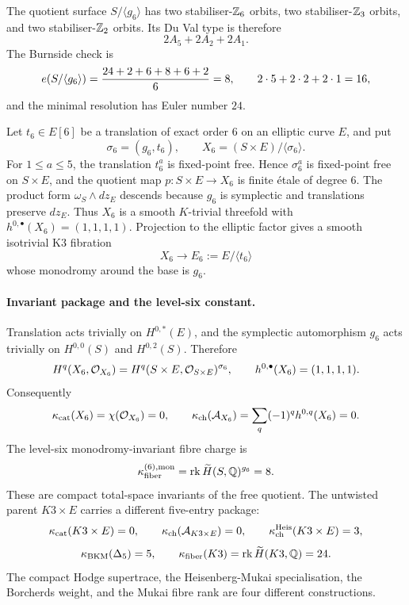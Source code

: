 The quotient surface $S/\langle g_6\rangle$ has two
stabiliser-$\mathbb{Z}_6$ orbits, two stabiliser-$\mathbb{Z}_3$ orbits, and two
stabiliser-$\mathbb{Z}_2$ orbits. Its Du Val type is therefore
\[
  2A_5+2A_2+2A_1 .
\]
The Burnside check is
\[
   e(S/\langle g_6\rangle)
   = {24+2+6+8+6+2\over 6}=8,\qquad
   2\cdot5+2\cdot2+2\cdot1=16,
\]
and the minimal resolution has Euler number $24$.

Let $t_6\in E[6]$ be a translation of exact order $6$ on an elliptic
curve $E$, and put
\[
  \sigma_6=(g_6,t_6),\qquad
  X_6=(S\times E)/\langle\sigma_6\rangle .
\]
For $1\leq a\leq5$, the translation $t_6^a$ is fixed-point free. Hence
$\sigma_6^a$ is fixed-point free on $S\times E$, and the quotient map
$p\colon S\times E\to X_6$ is finite \'{e}tale of degree $6$. The product
form $\omega_S\wedge dz_E$ descends because $g_6$ is symplectic and
translations preserve $dz_E$. Thus $X_6$ is a smooth $K$-trivial
threefold with $h^{0,\bullet}(X_6)=(1,1,1,1)$. Projection to the
elliptic factor gives a smooth isotrivial K3 fibration
\[
  X_6\longrightarrow E_6:=E/\langle t_6\rangle
\]
whose monodromy around the base is $g_6$.

\paragraph{Invariant package and the level-six constant.}
Translation acts trivially on $H^{0,*}(E)$, and the symplectic
automorphism $g_6$ acts trivially on $H^{0,0}(S)$ and $H^{0,2}(S)$.
Therefore
\[
  H^q(X_6,\mathcal{O}_{X_6})
  =
  H^q(S\times E,\mathcal{O}_{S\times E})^{\sigma_6},
  \qquad
  h^{0,\bullet}(X_6)=(1,1,1,1).
\]
Consequently
\[
  \kappa_{\mathrm{cat}}(X_6)=\chi(\mathcal{O}_{X_6})=0,\qquad
  \kappa_{\mathrm{ch}}(\mathcal{A}_{X_6})=\sum_q(-1)^q h^{0,q}(X_6)=0 .
\]
The level-six monodromy-invariant fibre charge is
\[
  \kappa_{\mathrm{fiber}}^{(6),\mathrm{mon}}
  =
  \operatorname{rk}\widetilde H(S,\mathbb{Q})^{g_6}
  =
  8.
\]
These are compact total-space invariants of the free quotient. The
untwisted parent $K3\times E$ carries a different five-entry package:
\[
  \kappa_{\mathrm{cat}}(K3\times E)=0,\qquad
  \kappa_{\mathrm{ch}}(\mathcal{A}_{K3\times E})=0,\qquad
  \kappa_{\mathrm{ch}}^{\mathrm{Heis}}(K3\times E)=3,
\]
\[
  \kappa_{\mathrm{BKM}}(\Delta_5)=5,\qquad
  \kappa_{\mathrm{fiber}}(K3)=\operatorname{rk}\widetilde H(K3,\mathbb{Q})=24.
\]
The compact Hodge supertrace, the Heisenberg-Mukai specialisation, the
Borcherds weight, and the Mukai fibre rank are four different
constructions.

